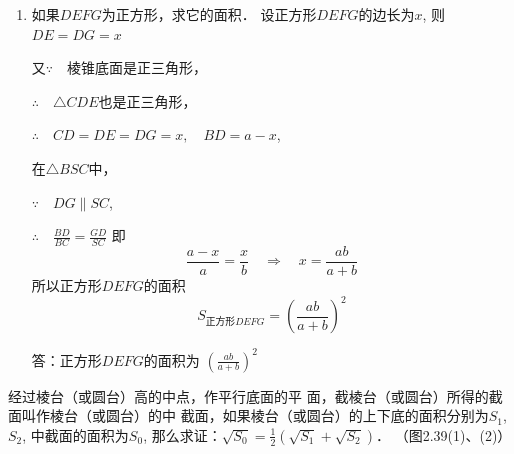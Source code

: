 \begin{solution}
\begin{enumerate}
\item 如果$DEFG$为正方形，求它的面积．
设正方形$DEFG$的边长为$x$, 则
$DE=DG=x$

又$\because\quad $棱锥底面是正三角形，

$\therefore\quad \triangle  CDE$也是正三角形，

$\therefore\quad CD=DE=DG=x,\quad BD=a-x$,

在$\triangle BSC$中，

$\because\quad DG\parallel SC$,

$\therefore\quad \frac{BD}{BC}=\frac{GD}{SC}$
即
\[\frac{a-x}{a}=\frac{x}{b}\quad \Rightarrow\quad x=\frac{ab}{a+b}\]
所以正方形$DEFG$的面积
\[S_{\text{正方形}DEFG}=\left(\frac{ab}{a+b}\right)^2\]

答：正方形$DEFG$的面积为
$\left(\frac{ab}{a+b}\right)^2$
\end{enumerate}
\end{solution}

\begin{example}
    经过棱台（或圆台）高的中点，作平行底面的平
面，截棱台（或圆台）所得的截面叫作棱台（或圆台）的中
截面，如果棱台（或圆台）的上下底的面积分别为$S_1$, $S_2$,
中截面的面积为$S_0$, 那么求证：$\sqrt{S_0}=\frac{1}{2}\left(\sqrt{S_1}+\sqrt{S_2}\right)$．
（图2.39(1)、(2)）
\end{example}

